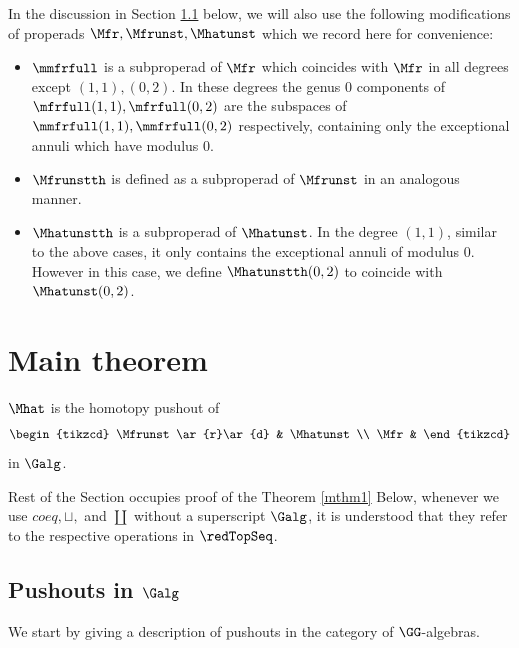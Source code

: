 \documentclass[a4paper,10pt]{amsart}
\begin{document}
	In the discussion in Section \ref{} below, we will also use the following modifications of properads $\Mfr, \Mfrunst, \Mhatunst$ which we record here for convenience:
	\begin{itemize}
\item $\mmfrfull$ is a subproperad of $\Mfr$ which coincides with $\Mfr$ in all degrees except $(1,1), (0,2)$. In these degrees the genus $0$ components of $\mfrfull(1,1),\mfrfull(0,2)$ are the subspaces of $\mmfrfull(1,1), \mmfrfull(0,2)$ respectively, containing only the exceptional annuli which have modulus $0$. 
\item $\Mfrunstth$ is defined as a subproperad of $\Mfrunst$ in an analogous manner.
\item $\Mhatunstth$ is a subproperad of $\Mhatunst$. In the degree $(1,1)$, similar to the above cases, it only contains the exceptional annuli of modulus $0$. However in this case, we define $\Mhatunstth(0,2)$ to coincide with $\Mhatunst(0,2)$.
\end{itemize}
	
\section{Main theorem}
\begin{theorem}\label{mthm1}
	$\Mhat$ is the homotopy pushout of 
	\begin{equation}\label{thm1dgm}
		\begin{tikzcd}
		\Mfrunst \ar{r}\ar{d} & \Mhatunst\\
		\Mfr & 
		\end{tikzcd}
	\end{equation}
	in $\Galg$.
\end{theorem}

Rest of the Section occupies proof of the Theorem \ref{mthm1}
Below, whenever we use $coeq,\sqcup,$ and $\coprod$ without a superscript $\Galg$, it is understood that they refer to the respective operations in $\redTopSeq$.

\subsection{Pushouts in $\Galg$}
We start by giving a description of pushouts in the category of $\GG$-algebras.
\end{document}
